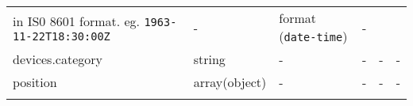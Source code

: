 \documentclass[
]{article}
\begin{document}
\begin{longtable}[]{@{}llllll@{}}
\begin{minipage}[t]{0.14\columnwidth}
in IS0 8601 format. eg. \texttt{1963-11-22T18:30:00Z}\strut
\end{minipage} & \begin{minipage}[t]{0.14\columnwidth}\raggedright
-\strut
\end{minipage} & \begin{minipage}[t]{0.14\columnwidth}\raggedright
format (\texttt{date-time})\strut
\end{minipage} & \begin{minipage}[t]{0.14\columnwidth}\raggedright
-\strut
\end{minipage}\tabularnewline
\begin{minipage}[t]{0.14\columnwidth}\raggedright
devices.category\strut
\end{minipage} & \begin{minipage}[t]{0.14\columnwidth}\raggedright
string\strut
\end{minipage} & \begin{minipage}[t]{0.14\columnwidth}\raggedright
-\strut
\end{minipage} & \begin{minipage}[t]{0.14\columnwidth}\raggedright
-\strut
\end{minipage} & \begin{minipage}[t]{0.14\columnwidth}\raggedright
-\strut
\end{minipage} & \begin{minipage}[t]{0.14\columnwidth}\raggedright
-\strut
\end{minipage}\tabularnewline
\begin{minipage}[t]{0.14\columnwidth}\raggedright
position\strut
\end{minipage} & \begin{minipage}[t]{0.14\columnwidth}\raggedright
array(object)\strut
\end{minipage} & \begin{minipage}[t]{0.14\columnwidth}\raggedright
-\strut
\end{minipage} & \begin{minipage}[t]{0.14\columnwidth}\raggedright
-\strut
\end{minipage} & \begin{minipage}[t]{0.14\columnwidth}\raggedright
-\strut
\end{minipage} & \begin{minipage}[t]{0.14\columnwidth}\raggedright
-\strut
\end{minipage}\tabularnewline
\begin{minipage}[t]{0.14\columnwidth}\raggedright

\end{minipage}
\end{longtable}
\end{document}
